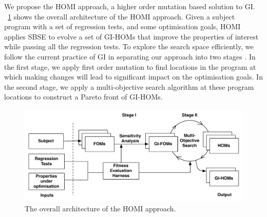 \documentclass[oribibl]{llncs}
\begin{document}
We propose the HOMI approach, a higher order mutation based solution to GI. \figurename~\ref{fig_framework} shows the overall architecture of the HOMI approach. Given a subject program with a set of regression tests, and some optimisation goals, HOMI applies SBSE to evolve a set of GI-HOMs that improve the properties of interest while passing all the regression tests.  To explore the search space efficiently, we follow the current practice of GI in separating our approach into two stages \cite{6733370}. In the first stage, we apply first order mutation to find locations in the program at which making changes will lead to significant impact on the optimisation goals. In the second stage, we apply a multi-objective search algorithm at these program locations to construct a Pareto front of GI-HOMs. 


\vspace{-5mm}

\begin{figure}[h]
\centering
\includegraphics[width=1.0\textwidth]{framework}
\caption{The overall architecture of the HOMI approach.}\label{fig_framework}
\end{figure}
\end{document}
